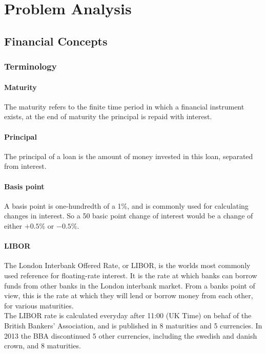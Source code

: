 \documentclass{article}
\theoremstyle{definition}
\begin{document}
\section{Problem Analysis}

\subsection{Financial Concepts}

\subsubsection{Terminology}
\paragraph{Maturity}
The maturity refers to the finite time period in which a financial instrument
exists, at the end of maturity the principal is repaid with interest. 

\paragraph{Principal}
The principal of a loan is the amount of money invested in this loan, separated from interest. 
\paragraph{Basis point}
A basis point is one-hundredth of a 1\%, and is commonly used for calculating
changes in interest\cite{InvOp}. So a 50 basic point change of interest would be a change of either $+0.5\%$ or $-0.5\%$.
\paragraph{LIBOR}
The London Interbank Offered Rate, or LIBOR, is the worlds most commonly used reference for floating-rate interest. It is the rate at which
banks can borrow funds from other banks in the London interbank market. From a banks point of view, this is the rate at which they will
lend or borrow money from each other, for various maturities\cite{LIBOR}.\\ 
The LIBOR rate is calculated everyday after 11:00 (UK Time) on behaf of the British Bankers' Association\cite{LIBORInfo},
and is published in 8 maturities and 5 currencies\cite{LIBORRate}. In 2013 the BBA discontinued 5 other currencies, including the swedish and danish crown, and 
8 maturities\cite{LIBORDisc}. \\
\end{document}

